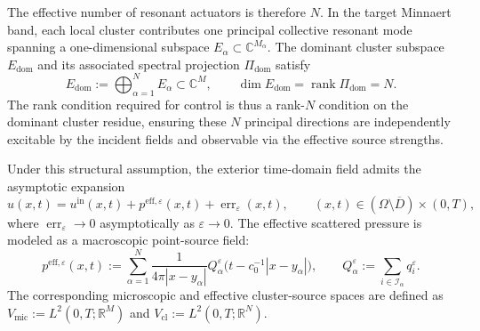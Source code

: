 \documentclass[11pt,a4paper]{article}
\numberwithin{equation}{section}
\begin{document}
\noindent
The effective number of resonant actuators is therefore $N$. In the target Minnaert band, each local cluster contributes one principal collective resonant mode spanning a one-dimensional subspace $E_\alpha \subset \mathbb{C}^{M_\alpha}$. The dominant cluster subspace $E_{\mathrm{dom}}$ and its associated spectral projection $\Pi_{\mathrm{dom}}$ satisfy
\begin{equation}
\label{eq:dominant-cluster-subspace}
  E_{\mathrm{dom}} := \bigoplus_{\alpha=1}^N E_\alpha \subset \mathbb{C}^M, \qquad \dim E_{\mathrm{dom}} = \operatorname{rank} \Pi_{\mathrm{dom}} = N.
\end{equation}
The rank condition required for control is thus a rank-$N$ condition on the dominant cluster residue, ensuring these $N$ principal directions are independently excitable by the incident fields and observable via the effective source strengths.


\noindent
Under this structural assumption, the exterior time-domain field admits the asymptotic expansion
\begin{equation}
\label{eq:physical-eff-error-local}
  u(x,t) = u^{\mathrm{in}}(x,t) + p^{\mathrm{eff},\varepsilon}(x,t) + \operatorname{err}_{\varepsilon}(x,t),
  \qquad (x,t)\in (\Omega\setminus \overline D)\times(0,T),
\end{equation}
where $\operatorname{err}_{\varepsilon} \to 0$ asymptotically as $\varepsilon \to 0$. The effective scattered pressure is modeled as a macroscopic point-source field:
\begin{equation}
\label{eq:def-peff-intro}
 p^{\mathrm{eff},\varepsilon}(x,t) := \sum_{\alpha=1}^N \frac{1}{4\pi|x-y_\alpha|} Q_\alpha^\varepsilon\bigl(t - c_0^{-1}|x-y_\alpha|\bigr), \qquad Q_\alpha^\varepsilon := \sum_{i \in \mathcal{I}_\alpha} q_i^\varepsilon.
\end{equation}
The corresponding microscopic and effective cluster-source spaces are defined as $V_{\mathrm{mic}} := L^2(0,T;\mathbb{R}^M)$ and $V_{\mathrm{cl}} := L^2(0,T;\mathbb{R}^N)$.
\end{document}
